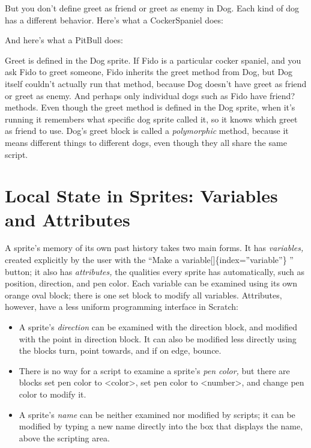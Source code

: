 \documentclass[
  letterpaper,
]{book}
\begin{document}
But you don't define greet as friend or greet as enemy in Dog. Each kind
of dog has a different behavior. Here's what a CockerSpaniel does:

And here's what a PitBull does:

Greet is defined in the Dog sprite. If Fido is a particular cocker
spaniel, and you ask Fido to greet someone, Fido inherits the greet
method from Dog, but Dog itself couldn't actually run that method,
because Dog doesn't have greet as friend or greet as enemy. And perhaps
only individual dogs such as Fido have friend? methods. Even though the
greet method is defined in the Dog sprite, when it's running it
remembers what specific dog sprite called it, so it knows which greet as
friend to use. Dog's greet block is called a \emph{polymorphic} method,
because it means different things to different dogs, even though they
all share the same script.

\section{Local State in Sprites: Variables and
Attributes}\label{local-state-in-sprites-variables-and-attributes}

A sprite's memory of its own past history takes two main forms. It has
\emph{variables,} created explicitly by the user with the ``Make a
variable{[}{]}\{index=''variable''\} '' button; it also has
\emph{attributes,} the qualities every sprite has automatically, such as
position, direction, and pen color. Each variable can be examined using
its own orange oval block; there is one set block to modify all
variables. Attributes, however, have a less uniform programming
interface in Scratch:

\begin{itemize}
\item
  A sprite's \emph{direction} can be examined with the direction block,
  and modified with the point in direction block. It can also be
  modified less directly using the blocks turn, point towards, and if on
  edge, bounce.
\item
  There is no way for a script to examine a sprite's \emph{pen color,}
  but there are blocks set pen color to \textless color\textgreater, set
  pen color to \textless number\textgreater, and change pen color to
  modify it.
\item
  A sprite's \emph{name} can be neither examined nor modified by
  scripts; it can be modified by typing a new name directly into the box
  that displays the name, above the scripting area.
\end{itemize}
\end{document}
